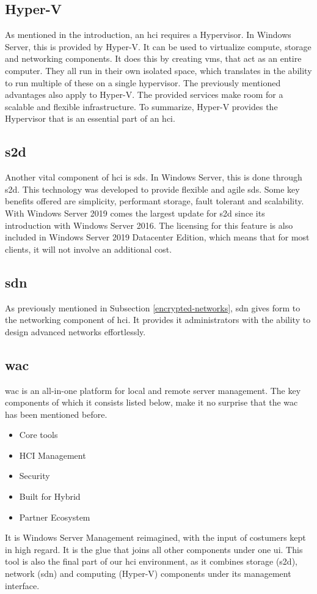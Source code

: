 \subsection{Hyper-V}
As mentioned in the introduction, an \acrshort{hci} requires a Hypervisor. 
In Windows Server, this is provided by Hyper-V. It can be used to virtualize compute, storage and networking components.
It does this by creating \acrshort{vm}s, that act as an entire computer. 
They all run in their own isolated space, which translates in the ability to run multiple of these on a single hypervisor. 
The previously mentioned advantages also apply to Hyper-V. The provided services make room for a scalable and flexible infrastructure. 
To summarize, Hyper-V provides the Hypervisor that is an essential part of an \acrshort{hci}. \autocite{Short2016}
\subsection{\acrfull{s2d}}
Another vital component of \acrshort{hci} is \acrfull{sds}. 
In Windows Server, this is done through \acrshort{s2d}. 
This technology was developed to provide flexible and agile \acrshort{sds}. 
Some key benefits offered are simplicity, performant storage, fault tolerant and scalability. 
With Windows Server 2019 comes the largest update for \acrshort{s2d} since its introduction with Windows Server 2016. 
The licensing for this feature is also included in Windows Server 2019 Datacenter Edition, which means that for most clients, it will not involve an additional cost. \autocite{Gerend2018a}
\subsection{\acrfull{sdn}}
As previously mentioned in Subsection \ref{encrypted-networks}, \acrshort{sdn} gives form to the networking component of \acrshort{hci}. 
It provides \acrshort{it} administrators with the ability to design advanced networks effortlessly.
\subsection{\acrfull{wac}}
\acrlong{wac} is an all-in-one platform for local and remote server management. 
The key components of which it consists listed below, make it no surprise that the \acrlong{wac} has been mentioned before. 
\begin{itemize}
	\item Core tools
	\item HCI Management
	\item Security
	\item Built for Hybrid
	\item Partner Ecosystem
\end{itemize}
It is Windows Server Management reimagined, with the input of costumers kept in high regard. 
It is the glue that joins all other components under one \acrfull{ui}. 
This tool is also the final part of our \acrshort{hci} environment, as it combines storage (\acrshort{s2d}), network (\acrshort{sdn}) and computing (Hyper-V) components under its management interface. 

